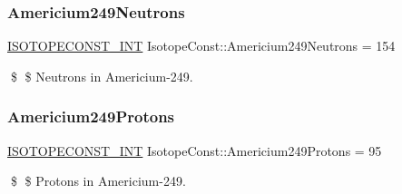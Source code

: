 \subsubsection{\texorpdfstring{Americium249\+Neutrons}{Americium249Neutrons}}
{\footnotesize\ttfamily \mbox{\hyperlink{group___isotope_const-_macros_ga5f18360b3e99483a35c32d789e62621c}{I\+S\+O\+T\+O\+P\+E\+C\+O\+N\+S\+T\+\_\+\+I\+NT}} Isotope\+Const\+::\+Americium249\+Neutrons = 154}

\$ \$ Neutrons in Americium-\/249. \mbox{\label{group___isotope_const-_americium-_am249_ga50b6388c6b5a968d3c5f1e6560a71ae2}} 
\subsubsection{\texorpdfstring{Americium249\+Protons}{Americium249Protons}}
{\footnotesize\ttfamily \mbox{\hyperlink{group___isotope_const-_macros_ga5f18360b3e99483a35c32d789e62621c}{I\+S\+O\+T\+O\+P\+E\+C\+O\+N\+S\+T\+\_\+\+I\+NT}} Isotope\+Const\+::\+Americium249\+Protons = 95}

\$ \$ Protons in Americium-\/249. 